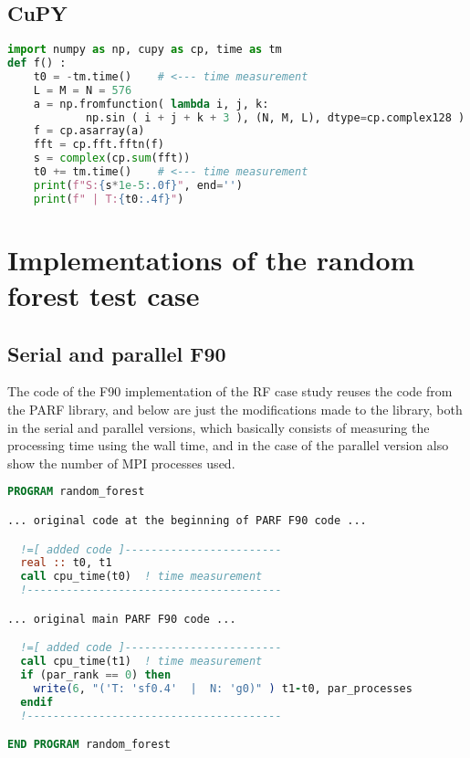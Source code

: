 \subsection{CuPY}
\begin{lstlisting}[language=Python, caption={CuPY implementation of the FFT test case.}]
import numpy as np, cupy as cp, time as tm
def f() :
    t0 = -tm.time()    # <--- time measurement
    L = M = N = 576
    a = np.fromfunction( lambda i, j, k:
            np.sin ( i + j + k + 3 ), (N, M, L), dtype=cp.complex128 )
    f = cp.asarray(a)
    fft = cp.fft.fftn(f)
    s = complex(cp.sum(fft))
    t0 += tm.time()    # <--- time measurement
    print(f"S:{s*1e-5:.0f}", end='')
    print(f" | T:{t0:.4f}")
\end{lstlisting}








%
%
%
%
%
%
%
\section{Implementations of the random forest test case}




\subsection{Serial and parallel F90}

The code of the F90 implementation of the RF case study reuses the code from the PARF library, and below are just the modifications made to the library, both in the serial and parallel versions, which basically consists of measuring the processing time using the wall time, and in the case of the parallel version also show the number of MPI processes used.

\begin{lstlisting}[language=Fortran, caption={Serial F90 implementation of the RF test case.}]
PROGRAM random_forest

... original code at the beginning of PARF F90 code ...

  !=[ added code ]------------------------
  real :: t0, t1
  call cpu_time(t0)  ! time measurement
  !---------------------------------------

... original main PARF F90 code ...

  !=[ added code ]------------------------
  call cpu_time(t1)  ! time measurement
  if (par_rank == 0) then       
    write(6, "('T: 'sf0.4'  |  N: 'g0)" ) t1-t0, par_processes
  endif
  !---------------------------------------

END PROGRAM random_forest
\end{lstlisting}




